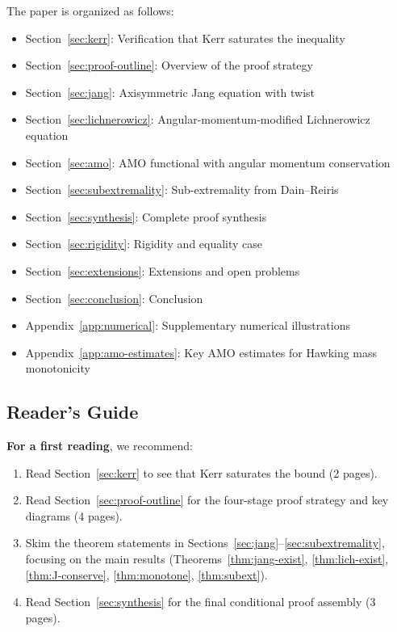 The paper is organized as follows:
\begin{itemize}
    \item Section~\ref{sec:kerr}: Verification that Kerr saturates the inequality
    \item Section~\ref{sec:proof-outline}: Overview of the proof strategy
    \item Section~\ref{sec:jang}: Axisymmetric Jang equation with twist
    \item Section~\ref{sec:lichnerowicz}: Angular-momentum-modified Lichnerowicz equation
    \item Section~\ref{sec:amo}: AMO functional with angular momentum conservation
    \item Section~\ref{sec:subextremality}: Sub-extremality from Dain--Reiris
    \item Section~\ref{sec:synthesis}: Complete proof synthesis
    \item Section~\ref{sec:rigidity}: Rigidity and equality case
    \item Section~\ref{sec:extensions}: Extensions and open problems
    \item Section~\ref{sec:conclusion}: Conclusion
    \item Appendix~\ref{app:numerical}: Supplementary numerical illustrations
    \item Appendix~\ref{app:amo-estimates}: Key AMO estimates for Hawking mass monotonicity
\end{itemize}

\subsection{Reader's Guide}\label{subsec:reader-guide}

\textbf{For a first reading}, we recommend:
\begin{enumerate}
    \item Read Section~\ref{sec:kerr} to see that Kerr saturates the bound (2 pages).
    \item Read Section~\ref{sec:proof-outline} for the four-stage proof strategy and key diagrams (4 pages).
    \item Skim the theorem statements in Sections~\ref{sec:jang}--\ref{sec:subextremality}, focusing on the main results (Theorems~\ref{thm:jang-exist}, \ref{thm:lich-exist}, \ref{thm:J-conserve}, \ref{thm:monotone}, \ref{thm:subext}).
    \item Read Section~\ref{sec:synthesis} for the final conditional proof assembly (3 pages).
\end{enumerate}

